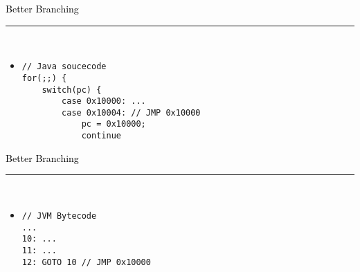 \documentclass[letter]{seminar}
\begin{document}
\begin{slide}\raggedright
\renewcommand{\leftmargini}{5mm}
{\Large{\textcolor{black}{Better Branching}}}
\\\rule{\textwidth}{0.1pt}\\

\begin{itemize}

\item \vspace{5mm}



\begin{Verbatim}[fontsize=\tiny,frame=single,rulecolor=\color{CodeBorder},resetmargins=true,gobble=0]
// Java soucecode
for(;;) {
    switch(pc) {
        case 0x10000: ...
        case 0x10004: // JMP 0x10000
            pc = 0x10000; 
            continue
\end{Verbatim}


\end{itemize}


\end{slide}


\begin{slide}\raggedright
\renewcommand{\leftmargini}{5mm}
{\Large{\textcolor{black}{Better Branching}}}
\\\rule{\textwidth}{0.1pt}\\

\begin{itemize}

\item \vspace{5mm}



\begin{Verbatim}[fontsize=\tiny,frame=single,rulecolor=\color{CodeBorder},resetmargins=true,gobble=0]
// JVM Bytecode
...
10: ...
11: ...
12: GOTO 10 // JMP 0x10000
\end{Verbatim}


\end{itemize}


\end{slide}
\end{document}
